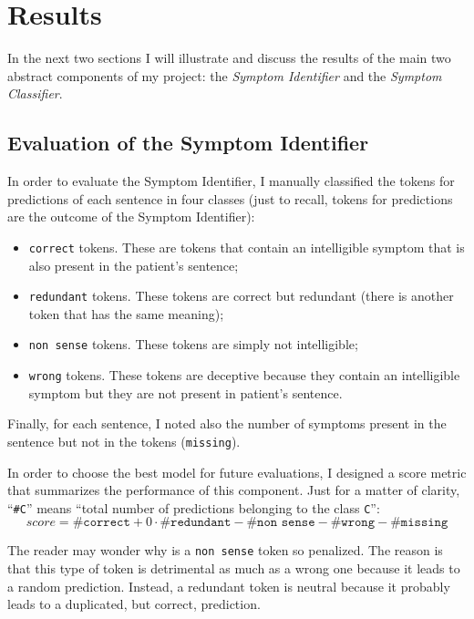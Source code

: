 \chapter{Results}
\label{cha:results}
In the next two sections I will illustrate and discuss the results of the main two abstract components of my project: the \textit{Symptom Identifier} and the \textit{Symptom Classifier}.

\section{Evaluation of the Symptom Identifier}
\label{sec:eval_symptom_identifier}
In order to evaluate the Symptom Identifier, I manually classified the tokens for predictions of each sentence in four classes (just to recall, tokens for predictions are the outcome of the Symptom Identifier):
\begin{itemize}
  \item \texttt{correct} tokens. These are tokens that contain an intelligible symptom that is also present in the patient's sentence;
  \item \texttt{redundant} tokens. These tokens are correct but redundant (there is another token that has the same meaning);
  \item \texttt{non sense} tokens. These tokens are simply not intelligible;
  \item \texttt{wrong} tokens. These tokens are deceptive because they contain an intelligible symptom but they are not present in patient's sentence.
\end{itemize}

Finally, for each sentence, I noted also the number of symptoms present in the sentence but not in the tokens (\texttt{missing}).

In order to choose the best model for future evaluations, I designed a score metric that summarizes the performance of this component. Just for a matter of clarity, ``\texttt{\#C}'' means ``total number of predictions belonging to the class \texttt{C}'':
\begin{equation}
score = \texttt{\#correct} + 0 \cdot \texttt{\#redundant} - \texttt{\#non sense} - \texttt{\#wrong} - \texttt{\#missing}
\end{equation}

The reader may wonder why is a \texttt{non sense} token so penalized. The reason is that this type of token is detrimental as much as a wrong one because it leads to a random prediction. Instead, a redundant token is neutral because it probably leads to a duplicated, but correct, prediction.

